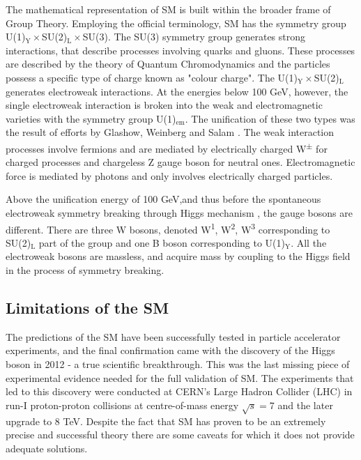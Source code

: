 The mathematical representation of SM is built within the broader frame of Group Theory. Employing the official terminology, SM has the symmetry group U(1)$_{\text{Y}}\times$SU(2)$_{\text{L}}\times$SU(3). The SU(3) symmetry group generates strong interactions, that describe processes involving quarks and gluons. These processes are described by the theory of Quantum Chromodynamics and the particles possess a specific type of charge known as "colour charge".
The U(1)$_{\text{Y}}\times$SU(2)$_{\text{L}}$ generates electroweak interactions. At the energies below 100 GeV, however, the single electroweak interaction is broken into the weak and electromagnetic varieties with the symmetry group U(1)$_{\text{em}}$. 
The unification of these two types was the result of efforts by Glashow, Weinberg and Salam \citep{Glashow:1961tr,weinberg1967model,salam1968elementary}. 
The weak interaction processes involve fermions and are mediated by electrically charged W\textsuperscript{$\pm$} for charged processes and chargeless Z gauge boson for neutral ones. Electromagnetic force is mediated by photons and only involves electrically charged particles. 

Above the unification energy of 100 GeV,and thus before the spontaneous electroweak symmetry breaking  through Higgs mechanism \citep{englert1964broken, higgs1964broken}, the gauge bosons are different. There are three W bosons, denoted W\textsuperscript{1}, W\textsuperscript{2}, W\textsuperscript{3} corresponding to SU(2)$_{\text{L}}$ part of the group and one B boson corresponding to U(1)$_{\text{Y}}$. 
All the electroweak bosons are massless, and acquire mass by coupling to the Higgs field in the process of symmetry breaking.  

\subsection{Limitations of the SM}

The predictions of the SM have been successfully tested in particle accelerator experiments, and the final confirmation came with the discovery of the Higgs boson in 2012 - a true scientific breakthrough. This was the last missing piece of experimental evidence needed for the full validation of SM. The experiments that led to this discovery were conducted at CERN’s Large Hadron Collider (LHC) in run-I proton-proton collisions at centre-of-mass energy $\sqrt{s}=$7 and the later upgrade to 8 TeV.  
Despite the fact that SM has proven to be an extremely precise and successful theory there are some caveats for which it does not provide  adequate solutions. 

